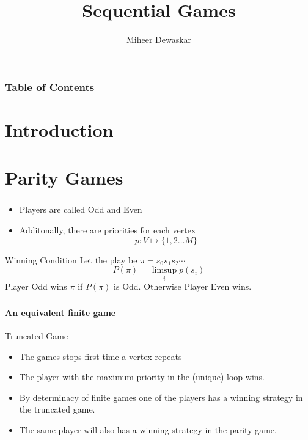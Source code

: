 \documentclass{beamer}
\title{Sequential Games}
\author[M. Dewaskar]{Miheer Dewaskar}
\institute[CMI]{Chennai Mathematical Institute}
\newenvironment{slide}
{\begin{frame}[environment=slide]
\frametitle{\insertsection}}
{\end{frame}}
\begin{document}
  \frame{\titlepage}

  \begin{frame}
    \frametitle{Table of Contents}
    \tableofcontents
  \end{frame}

  \section{Introduction}

  \section{Parity Games}

  \begin{slide}
    \begin{itemize}
      \item Players are called Odd and Even
      \item Additonally, there are  priorities for each vertex
      \[ p : V \mapsto \{1,2\ldots M\} \]
    \end{itemize}
    \begin{block}{Winning Condition}
      Let the play be $\pi = s_0s_1s_2\cdots$
        \[
          P(\pi) = \limsup_i p(s_i)
        \]
    Player Odd wins $\pi$ if $P(\pi)$ is Odd. Otherwise
    Player Even wins.
  \end{block}
\end{slide}


  \begin{slide}
    \framesubtitle{An equivalent finite game}

    \begin{block}{Truncated Game}
      \begin{itemize}
        \item The games stops first time a vertex repeats
        \item The player with the maximum priority in the (unique) loop wins.
      \end{itemize}
    \end{block}

    \pause
    \begin{itemize}
      \item By determinacy of finite games one of the players has a winning strategy in the truncated game.
      \item The same player will also has a winning strategy in the parity game.
    \end{itemize}
\end{slide}
\end{document}
